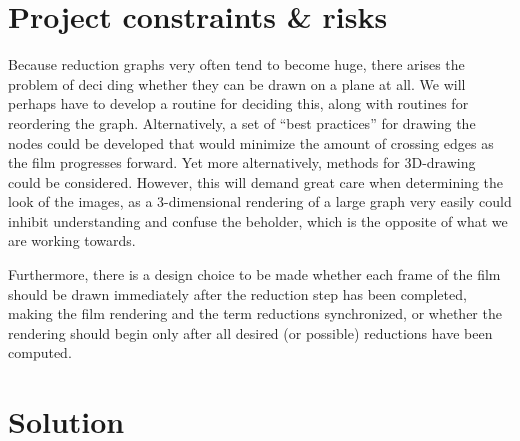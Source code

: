 \section{Project constraints \& risks}
Because reduction graphs very often tend to become huge, there arises the
problem of deci ding whether they can be drawn on a plane at all. We will
perhaps have to develop a routine for deciding this, along with routines for
reordering the graph. Alternatively, a set of ``best practices'' for drawing
the nodes could be developed that would minimize the amount of crossing edges
as the film progresses forward. Yet more alternatively, methods for 3D-drawing
could be considered. However, this will demand great care when determining the
look of the images, as a 3-dimensional rendering of a large graph very easily
could inhibit understanding and confuse the beholder, which is the opposite of
what we are working towards.

Furthermore, there is a design choice to be made whether each frame of the
film should be drawn immediately after the reduction step has been completed,
making the film rendering and the term reductions synchronized, or whether the
rendering should begin only after all desired (or possible) reductions have
been computed.

\section{Solution}

\newpage